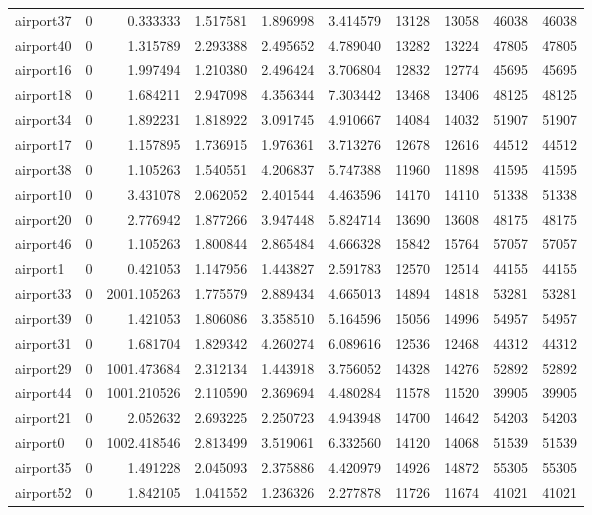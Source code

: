 \begin{longtable}{|l|r|r|r|r|r|r|r|r|r|}
airport37 & 0 & 0.333333 & 1.517581 & 1.896998 & 3.414579 & 13128 & 13058 & 46038 & 46038 \\
airport40 & 0 & 1.315789 & 2.293388 & 2.495652 & 4.789040 & 13282 & 13224 & 47805 & 47805 \\
airport16 & 0 & 1.997494 & 1.210380 & 2.496424 & 3.706804 & 12832 & 12774 & 45695 & 45695 \\
airport18 & 0 & 1.684211 & 2.947098 & 4.356344 & 7.303442 & 13468 & 13406 & 48125 & 48125 \\
airport34 & 0 & 1.892231 & 1.818922 & 3.091745 & 4.910667 & 14084 & 14032 & 51907 & 51907 \\
airport17 & 0 & 1.157895 & 1.736915 & 1.976361 & 3.713276 & 12678 & 12616 & 44512 & 44512 \\
airport38 & 0 & 1.105263 & 1.540551 & 4.206837 & 5.747388 & 11960 & 11898 & 41595 & 41595 \\
airport10 & 0 & 3.431078 & 2.062052 & 2.401544 & 4.463596 & 14170 & 14110 & 51338 & 51338 \\
airport20 & 0 & 2.776942 & 1.877266 & 3.947448 & 5.824714 & 13690 & 13608 & 48175 & 48175 \\
airport46 & 0 & 1.105263 & 1.800844 & 2.865484 & 4.666328 & 15842 & 15764 & 57057 & 57057 \\
airport1 & 0 & 0.421053 & 1.147956 & 1.443827 & 2.591783 & 12570 & 12514 & 44155 & 44155 \\
airport33 & 0 & 2001.105263 & 1.775579 & 2.889434 & 4.665013 & 14894 & 14818 & 53281 & 53281 \\
airport39 & 0 & 1.421053 & 1.806086 & 3.358510 & 5.164596 & 15056 & 14996 & 54957 & 54957 \\
airport31 & 0 & 1.681704 & 1.829342 & 4.260274 & 6.089616 & 12536 & 12468 & 44312 & 44312 \\
airport29 & 0 & 1001.473684 & 2.312134 & 1.443918 & 3.756052 & 14328 & 14276 & 52892 & 52892 \\
airport44 & 0 & 1001.210526 & 2.110590 & 2.369694 & 4.480284 & 11578 & 11520 & 39905 & 39905 \\
airport21 & 0 & 2.052632 & 2.693225 & 2.250723 & 4.943948 & 14700 & 14642 & 54203 & 54203 \\
airport0 & 0 & 1002.418546 & 2.813499 & 3.519061 & 6.332560 & 14120 & 14068 & 51539 & 51539 \\
airport35 & 0 & 1.491228 & 2.045093 & 2.375886 & 4.420979 & 14926 & 14872 & 55305 & 55305 \\
airport52 & 0 & 1.842105 & 1.041552 & 1.236326 & 2.277878 & 11726 & 11674 & 41021 & 41021 \\

\end{longtable}
